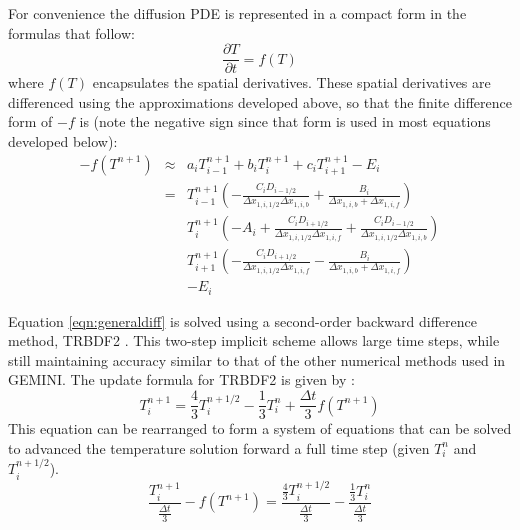 \documentclass[11pt,letterpaper]{article}
\begin{document}
For convenience the diffusion PDE is represented in a compact form in the formulas that follow:
\begin{equation}
\frac{\partial T}{\partial t} = f(T)
\end{equation}
where $f(T)$ encapsulates the spatial derivatives.  These spatial derivatives are differenced using the approximations developed above, so that the finite difference form of $-f$ is (note the negative sign since that form is used in most equations developed below):
\begin{eqnarray}
-f(T^{n+1}) &\approx& a_i T^{n+1}_{i-1} + b_i T^{n+1}_{i} + c_i T^{n+1}_{i+1} - E_i\nonumber \\
&=& T^{n+1}_{i-1} \left( - \frac{C_i D_{i-1/2}}{\Delta x_{1,i,1/2} \Delta x_{1,i,b}} + \frac{B_i}{\Delta x_{1,i,b} + \Delta x_{1,i,f}} \right) \nonumber \\
&~&  T^{n+1}_{i} \left( - A_i + \frac{C_i D_{i+1/2}}{\Delta x_{1,i,1/2} \Delta x_{1,i,f}} + \frac{C_i D_{i-1/2}}{\Delta x_{1,i,1/2} \Delta x_{1,i,b}} \right) \nonumber \\
&~&  T^{n+1}_{i+1} \left( - \frac{C_i D_{i+1/2}}{\Delta x_{1,i,1/2} \Delta x_{1,i,f}} - \frac{B_i}{\Delta x_{1,i,b} + \Delta x_{1,i,f}} \right) \nonumber \\
&~& - E_i
\end{eqnarray}

Equation \ref{eqn:generaldiff} is solved using a second-order backward difference method, TRBDF2 \citep{Leveque:2002}.  This two-step implicit scheme allows large time steps, while still maintaining accuracy similar to that of the other numerical methods used in GEMINI.  The update formula for TRBDF2 is given by \citep{Leveque:2002}:
\begin{equation}
T_i^{n+1} = \frac{4}{3} T_i^{n+1/2} - \frac{1}{3} T_i^{n} + \frac{\Delta t}{3} f(T^{n+1})
\end{equation}
This equation can be rearranged to form a system of equations that can be solved to advanced the temperature solution forward a full time step (given $T_i^{n}$ and $T_i^{n+1/2}$).  
\begin{equation}
\frac{T_i^{n+1}}{\frac{\Delta t}{3}} - f(T^{n+1})= \frac{\frac{4}{3} T_i^{n+1/2}}{\frac{\Delta t}{3}} - \frac{\frac{1}{3} T_i^{n}}{\frac{\Delta t}{3}} \label{eqn:TRBDF2}
\end{equation}
\end{document}
